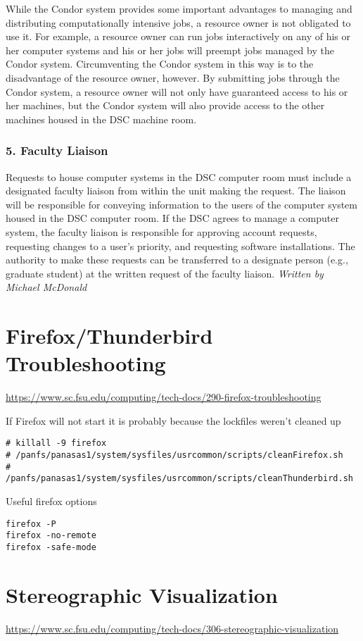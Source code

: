 \documentclass[12pt,a4paper]{article}
\begin{document}
While the Condor system provides some important advantages to managing and distributing computationally intensive jobs, a resource owner is not obligated to use it. For example, a resource owner can run jobs interactively on any of his or her computer systems and his or her jobs will preempt jobs managed by the Condor system. Circumventing the Condor system in this way is to the disadvantage of the resource owner, however. By submitting jobs through the Condor system, a resource owner will not only have guaranteed access to his or her machines, but the Condor system will also provide access to the other machines housed in the DSC machine room.

\subsubsection*{5. Faculty Liaison}
Requests to house computer systems in the DSC computer room must include a designated faculty liaison from within the unit making the request. The liaison will be responsible for conveying information to the users of the computer system housed in the DSC computer room. If the DSC agrees to manage a computer system, the faculty liaison is responsible for approving account requests, requesting changes to a user's priority, and requesting software installations. The authority to make these requests can be transferred to a designate person (e.g., graduate student) at the written request of the faculty liaison.
\hfill \textit{Written by Michael McDonald}

\section{Firefox/Thunderbird Troubleshooting}
\url{https://www.sc.fsu.edu/computing/tech-docs/290-firefox-troubleshooting}

If Firefox will not start it is probably because the lockfiles weren't cleaned up
\begin{verbatim}
# killall -9 firefox
# /panfs/panasas1/system/sysfiles/usrcommon/scripts/cleanFirefox.sh
# /panfs/panasas1/system/sysfiles/usrcommon/scripts/cleanThunderbird.sh
\end{verbatim}
Useful firefox options
\begin{verbatim}
firefox -P
firefox -no-remote
firefox -safe-mode
\end{verbatim}

\section{Stereographic Visualization}
\url{https://www.sc.fsu.edu/computing/tech-docs/306-stereographic-visualization}
\end{document}
